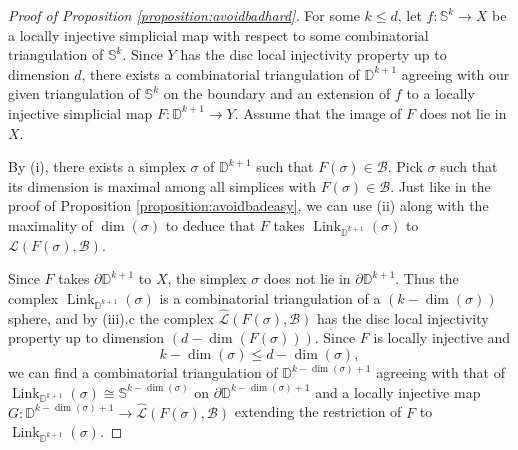 \documentclass[11pt]{amsart}
\numberwithin{equation}{section}
\theoremstyle{plain}
\theoremstyle{definition}
\theoremstyle{remark}
\newcommand\cB{\ensuremath{\mathcal{B}}}
\newcommand\cL{\ensuremath{\mathcal{L}}}
\newcommand\bbD{\ensuremath{\mathbb{D}}}
\newcommand\bbS{\ensuremath{\mathbb{S}}}
\newcommand\hcL{\ensuremath{\widehat{\cL}}}
\DeclareMathOperator{\Link}{Link}
\begin{document}
\begin{proof}[Proof of Proposition \ref{proposition:avoidbadhard}]
For some $k \leq d$, let $f\colon \bbS^k \rightarrow X$ be a locally injective
simplicial map with respect to some combinatorial triangulation of $\bbS^k$.  Since
$Y$ has the disc local injectivity property up to dimension $d$, there exists
a combinatorial triangulation of $\bbD^{k+1}$ agreeing with our given triangulation
of $\bbS^k$ on the boundary and an extension of $f$ to a locally injective
simplicial map $F\colon \bbD^{k+1} \rightarrow Y$.  Assume that the image of $F$ does not lie in $X$.

By (i), there exists a simplex $\sigma$ of $\bbD^{k+1}$ such that $F(\sigma) \in \cB$.  Pick
$\sigma$ such that its dimension is maximal among all simplices with $F(\sigma) \in \cB$.
Just like in the proof of Proposition \ref{proposition:avoidbadeasy}, we can use
(ii) along with the maximality of $\dim(\sigma)$ to deduce that
$F$ takes $\Link_{\bbD^{k+1}}(\sigma)$ to $\cL(F(\sigma),\cB)$.

Since $F$ takes $\partial \bbD^{k+1}$ to $X$, the simplex $\sigma$ does not
lie in $\partial \bbD^{k+1}$.  Thus the complex $\Link_{\bbD^{k+1}}(\sigma)$ is a combinatorial
triangulation of a $(k-\dim(\sigma))$ sphere, and by
(iii).c the complex $\hcL(F(\sigma),\cB)$ has the disc local injectivity property up
to dimension $(d-\dim(F(\sigma)))$.  Since $F$ is locally injective and
\[k-\dim(\sigma) \leq d-\dim(\sigma),\]
we can find a combinatorial triangulation of $\bbD^{k-\dim(\sigma)+1}$ agreeing with that of
$\Link_{\bbD^{k+1}}(\sigma) \cong \bbS^{k-\dim(\sigma)}$ on
$\partial \bbD^{k-\dim(\sigma)+1}$ and a locally injective map 
$G\colon \bbD^{k-\dim(\sigma)+1} \rightarrow \hcL(F(\sigma),\cB)$
extending the restriction of $F$ to $\Link_{\bbD^{k+1}}(\sigma)$.  


\end{proof}
\end{document}
